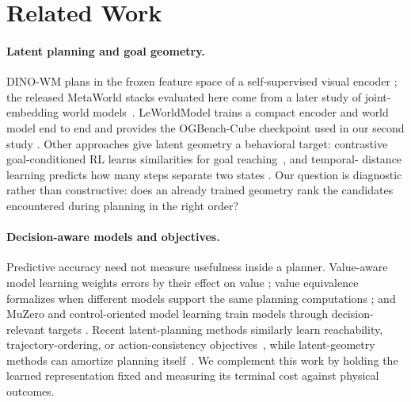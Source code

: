 \documentclass[10pt]{article}
\begin{document}
\section{Related Work}

\paragraph{Latent planning and goal geometry.}
DINO-WM plans in the frozen feature space of a self-supervised visual encoder
\citep{zhou2024dinowm}; the released MetaWorld stacks evaluated here come from
a later study of joint-embedding world models~\citep{jepawms2025}.
LeWorldModel trains a compact encoder and world model end to end and provides
the OGBench-Cube checkpoint used in our second study
\citep{maes2026lewm,maes2026stablewm,park2025ogbench}. Other approaches give
latent geometry a behavioral target: contrastive goal-conditioned RL learns
similarities for goal reaching~\citep{eysenbach2022contrastive}, and temporal-
distance learning predicts how many steps separate two states
\citep{myers2024temporal}. Our question is diagnostic rather than
constructive: does an already trained geometry rank the candidates encountered
during planning in the right order?

\paragraph{Decision-aware models and objectives.}
Predictive accuracy need not measure usefulness inside a planner. Value-aware
model learning weights errors by their effect on value
\citep{farahmand2017vaml,farahmand2018itervaml}; value equivalence formalizes
when different models support the same planning computations
\citep{grimm2020ve}; and MuZero and control-oriented model learning train
models through decision-relevant targets
\citep{schrittwieser2020muzero,nikishin2022omd}. Recent latent-planning methods
similarly learn reachability, trajectory-ordering, or action-consistency
objectives~\citep{rcaux2026,trm2026,acid2026}, while latent-geometry methods can
amortize planning itself~\citep{nguyen2026latentgeometry}. We complement this
work by holding the learned representation fixed and measuring its terminal
cost against physical outcomes.
\end{document}
